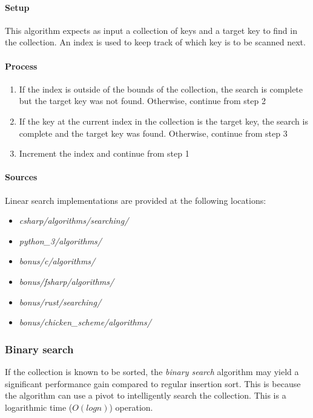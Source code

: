 \documentclass{article}
\begin{document}
\paragraph{Setup}
This algorithm expects as input a collection of keys and a target key to find in the collection. An index is used to keep track
of which key is to be scanned next.

\paragraph{Process}
\begin{enumerate}
\item{If the index is outside of the bounds of the collection, the search is complete but the target key was not found.
  Otherwise, continue from step 2}
\item{If the key at the current index in the collection is the target key, the search is complete and the target key was found.
  Otherwise, continue from step 3}
\item{Increment the index and continue from step 1}
\end{enumerate}

\begin{samepage}
  \paragraph{Sources}
  Linear search implementations are provided at the following locations:
  \begin{itemize}
  \item{{\em csharp/algorithms/searching/}}
  \item{{\em python\_3/algorithms/}}
  \item{{\em bonus/c/algorithms/}}
  \item{{\em bonus/fsharp/algorithms/}}
  \item{{\em bonus/rust/searching/}}
  \item{{\em bonus/chicken\_scheme/algorithms/}}
  \end{itemize}
\end{samepage}

\subsubsection{Binary search}
If the collection is known to be sorted, the {\em binary search} algorithm may yield a significant performance
gain compared to regular insertion sort. This is because the algorithm can use a pivot to intelligently search
the collection. This is a logarithmic time (\(O(log n)\)) operation.
\end{document}
